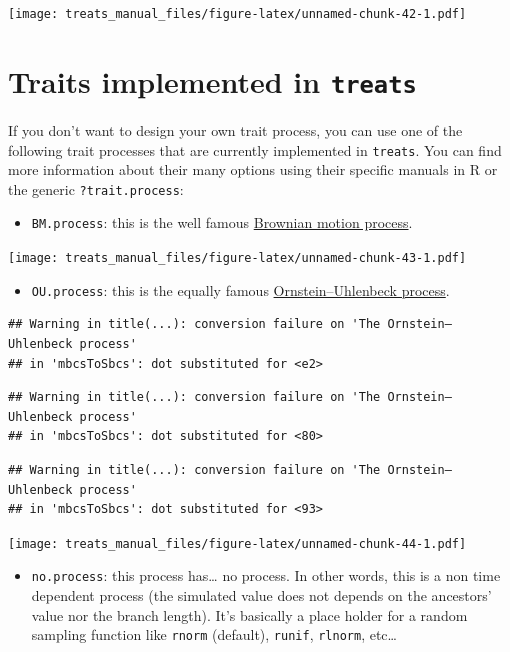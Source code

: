 \documentclass[
]{book}
\providecommand{\tightlist}{%
  \setlength{\itemsep}{0pt}\setlength{\parskip}{0pt}}
\begin{document}
\texttt{[image: treats\_manual\_files/figure-latex/unnamed-chunk-42-1.pdf]}

\hypertarget{traits-implemented-in-treats}{%
\section{\texorpdfstring{Traits implemented in \texttt{treats}}{Traits implemented in treats}}\label{traits-implemented-in-treats}}

If you don't want to design your own trait process, you can use one of the following trait processes that are currently implemented in \texttt{treats}. You can find more information about their many options using their specific manuals in R or the generic \texttt{?trait.process}:

\begin{itemize}
\tightlist
\item
  \texttt{BM.process}: this is the well famous \href{https://en.wikipedia.org/wiki/Brownian_motion}{Brownian motion process}.
\end{itemize}

\texttt{[image: treats\_manual\_files/figure-latex/unnamed-chunk-43-1.pdf]}

\begin{itemize}
\tightlist
\item
  \texttt{OU.process}: this is the equally famous \href{https://en.wikipedia.org/wiki/Ornstein\%E2\%80\%93Uhlenbeck_process}{Ornstein--Uhlenbeck process}.
\end{itemize}

\begin{verbatim}
## Warning in title(...): conversion failure on 'The Ornstein–Uhlenbeck process'
## in 'mbcsToSbcs': dot substituted for <e2>
\end{verbatim}

\begin{verbatim}
## Warning in title(...): conversion failure on 'The Ornstein–Uhlenbeck process'
## in 'mbcsToSbcs': dot substituted for <80>
\end{verbatim}

\begin{verbatim}
## Warning in title(...): conversion failure on 'The Ornstein–Uhlenbeck process'
## in 'mbcsToSbcs': dot substituted for <93>
\end{verbatim}

\texttt{[image: treats\_manual\_files/figure-latex/unnamed-chunk-44-1.pdf]}

\begin{itemize}
\tightlist
\item
  \texttt{no.process}: this process has\ldots{} no process. In other words, this is a non time dependent process (the simulated value does not depends on the ancestors' value nor the branch length). It's basically a place holder for a random sampling function like \texttt{rnorm} (default), \texttt{runif}, \texttt{rlnorm}, etc\ldots{}
\end{itemize}
\end{document}
